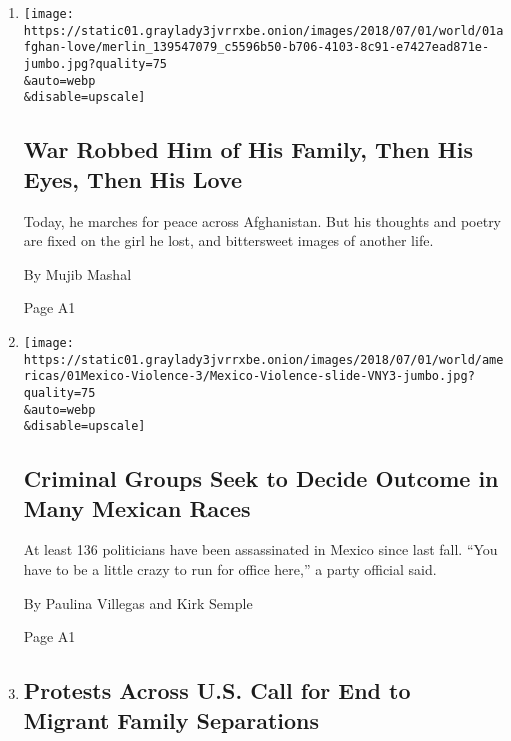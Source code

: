 \begin{enumerate}
\def\labelenumi{\arabic{enumi}.}
\item
  \href{/2018/06/30/world/asia/afghanistan-peace-march.html}{}

  \texttt{[image: https://static01.graylady3jvrrxbe.onion/images/2018/07/01/world/01afghan-love/merlin\_139547079\_c5596b50-b706-4103-8c91-e7427ead871e-jumbo.jpg?quality=75\\\&auto=webp\\\&disable=upscale]}

  \hypertarget{war-robbed-him-of-his-family-then-his-eyes-then-his-love}{%
  \subsection{War Robbed Him of His Family, Then His Eyes, Then His
  Love}\label{war-robbed-him-of-his-family-then-his-eyes-then-his-love}}

  Today, he marches for peace across Afghanistan. But his thoughts and
  poetry are fixed on the girl he lost, and bittersweet images of
  another life.

  By Mujib Mashal

  Page A1
\item
  \href{/2018/07/01/world/americas/mexico-election-assassinations.html}{}

  \texttt{[image: https://static01.graylady3jvrrxbe.onion/images/2018/07/01/world/americas/01Mexico-Violence-3/Mexico-Violence-slide-VNY3-jumbo.jpg?quality=75\\\&auto=webp\\\&disable=upscale]}

  \hypertarget{criminal-groups-seek-to-decide-outcome-in-many-mexican-races}{%
  \subsection{Criminal Groups Seek to Decide Outcome in Many Mexican
  Races}\label{criminal-groups-seek-to-decide-outcome-in-many-mexican-races}}

  At least 136 politicians have been assassinated in Mexico since last
  fall. ``You have to be a little crazy to run for office here,'' a
  party official said.

  By Paulina Villegas and Kirk Semple

  Page A1
\item
  \href{/2018/06/30/us/politics/trump-protests-family-separation.html}{}

  \hypertarget{protests-across-us-call-for-end-to-migrant-family-separations}{%
  \subsection{Protests Across U.S. Call for End to Migrant Family
  Separations}\label{protests-across-us-call-for-end-to-migrant-family-separations}}


\end{enumerate}
